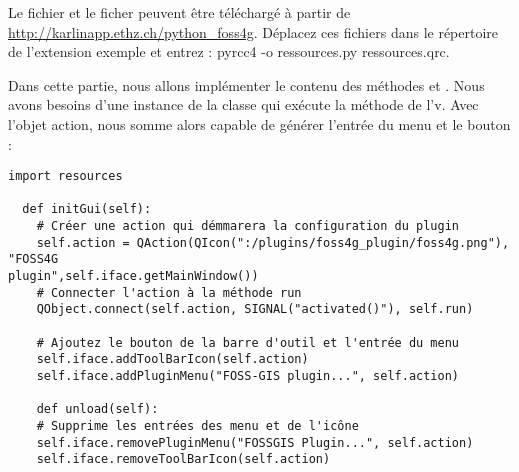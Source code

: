 Le fichier  et le ficher  peuvent
être téléchargé à partir de \url{http://karlinapp.ethz.ch/python\_foss4g}.
Déplacez ces fichiers dans le répertoire de l'extension exemple
 et entrez : pyrcc4 -o
ressources.py ressources.qrc.



Dans cette partie, nous allons implémenter le contenu des méthodes
 et . Nous avons besoins d'une instance de la
classe  qui exécute la méthode  de l'v. Avec
l'objet action, nous somme alors capable de générer l'entrée du menu et le
bouton :

\begin{verbatim}
import resources

  def initGui(self):
    # Créer une action qui démmarera la configuration du plugin
    self.action = QAction(QIcon(":/plugins/foss4g_plugin/foss4g.png"), "FOSS4G
plugin",self.iface.getMainWindow())
    # Connecter l'action à la méthode run
    QObject.connect(self.action, SIGNAL("activated()"), self.run)

    # Ajoutez le bouton de la barre d'outil et l'entrée du menu
    self.iface.addToolBarIcon(self.action)
    self.iface.addPluginMenu("FOSS-GIS plugin...", self.action)

    def unload(self):
    # Supprime les entrées des menu et de l'icône
    self.iface.removePluginMenu("FOSSGIS Plugin...", self.action)
    self.iface.removeToolBarIcon(self.action)
\end{verbatim}




